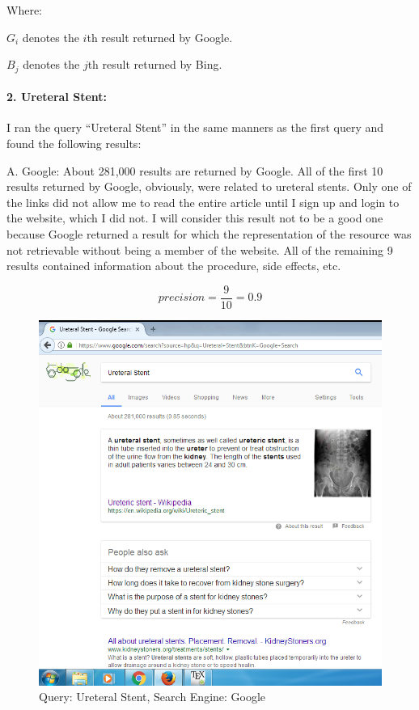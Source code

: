 \documentclass[a4paper, 11pt]{article}
\begin{document}
Where:

$G_i$ denotes the $i$th result returned by Google.

$B_j$ denotes the $j$th result returned by Bing.
 

\paragraph{2. Ureteral Stent:}
 
I ran the query ``Ureteral Stent'' in the same manners as the first query and found the following results:

A. Google:
About 281,000 results are returned by Google.
All of the first 10 results returned by Google, obviously, were related to ureteral stents. Only one of the links did not allow me to read the entire article until I sign up and login to the website, which I did not. I will consider this result not to be a good one because Google returned a result for which the representation of the resource was not retrievable without being a member of the website. All of the remaining 9 results contained information about the procedure, side effects, etc.

$$ 
precision = \frac{9}{10} = 0.9
$$

\pagebreak

\begin{figure}[h]
\caption{Query: Ureteral Stent, Search Engine: Google}
\centering
\includegraphics[scale=0.7]{Q1/ureteral_stent_Google.png}
\end{figure}
\end{document}
